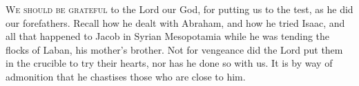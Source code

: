
\lettrine{W}{e should be grateful} to the Lord our God, for putting us to the test, as he did our forefathers. Recall how he dealt with Abraham, and how he tried Isaac, and all that happened to Jacob in Syrian Mesopotamia while he was tending the flocks of Laban, his mother’s brother. Not for vengeance did the Lord put them in the crucible to try their hearts, nor has he done so with us. It is by way of admonition that he chastises those who are close to him.
